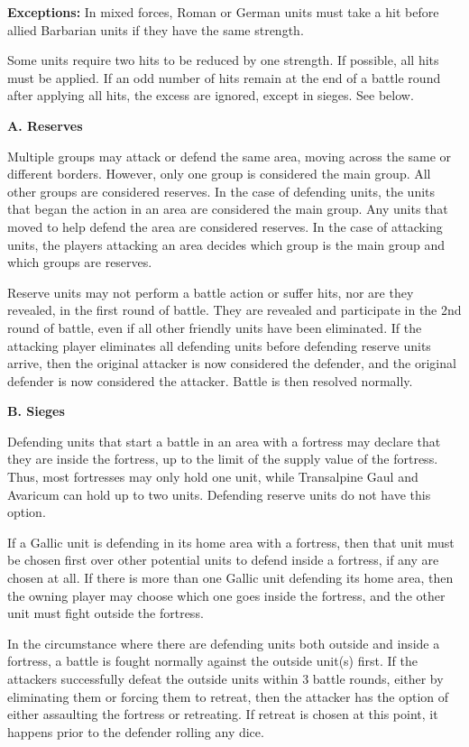 \textbf{Exceptions:} In mixed forces, Roman or German units must take a hit before allied Barbarian units if they have the same strength.

Some units require two hits to be reduced by one strength. If possible, all hits must be applied. If an odd number of hits remain at the end of a battle round after applying all hits, the excess are ignored, except in sieges. See below.

\textbf{A. Reserves}
\par
Multiple groups may attack or defend the same area, moving across the same or different borders. However, only one group is considered the main group. All other groups are considered reserves. In the case of defending units, the units that began the action in an area are considered the main group. Any units that moved to help defend the area are considered reserves. In the case of attacking units, the players attacking an area decides which group is the main group and which groups are reserves.

Reserve units may not perform a battle action or suffer hits, nor are they revealed, in the first round of battle. They are revealed and participate in the 2nd round of battle, even if all other friendly units have been eliminated. If the attacking player eliminates all defending units before defending reserve units arrive, then the original attacker is now considered the defender, and the original defender is now considered the attacker. Battle is then resolved normally.

\textbf{B. Sieges}
\par
Defending units that start a battle in an area with a fortress may declare that they are inside the fortress, up to the limit of the supply value of the fortress. Thus, most fortresses may only hold one unit, while Transalpine Gaul and Avaricum can hold up to two units. Defending reserve units do not have this option.

If a Gallic unit is defending in its home area with a fortress, then that unit must be chosen first over other potential units to defend inside a fortress, if any are chosen at all. If there is more than one Gallic unit defending its home area, then the owning player may choose which one goes inside the fortress, and the other unit must fight outside the fortress.

In the circumstance where there are defending units both outside and inside a fortress, a battle is fought normally against the outside unit(s) first. If the attackers successfully defeat the outside units within 3 battle rounds, either by eliminating them or forcing them to retreat, then the attacker has the option of either assaulting the fortress or retreating. If retreat is chosen at this point, it happens prior to the defender rolling any dice.

